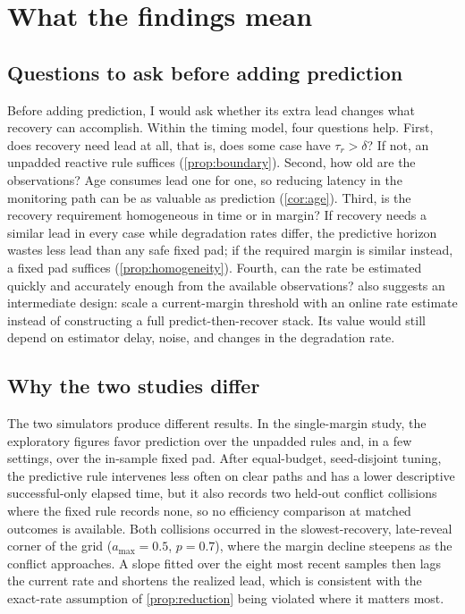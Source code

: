 \section{What the findings mean}
\label{sec:discussion}

\subsection{Questions to ask before adding prediction}

Before adding prediction, I would ask whether its extra lead changes what
recovery can accomplish.  Within the timing model, four questions help.
First, does recovery need lead at all, that is, does some case have
$\tau_r>\delta$?  If not, an unpadded reactive rule suffices
(\cref{prop:boundary}).  Second, how old are the observations?  Age consumes
lead one for one, so reducing latency in the monitoring path can be as valuable
as prediction (\cref{cor:age}).  Third, is the recovery requirement homogeneous
in time or in margin?  If recovery needs a similar lead in every case while
degradation rates differ, the predictive horizon wastes less lead than any safe
fixed pad; if the required margin is similar instead, a fixed pad suffices
(\cref{prop:homogeneity}).  Fourth, can the rate be estimated quickly and
accurately enough from the available observations?   also
suggests an intermediate design: scale a current-margin threshold with an online
rate estimate instead of constructing a full predict-then-recover stack.  Its
value would still depend on estimator delay, noise, and changes in the
degradation rate.

\subsection{Why the two studies differ}

The two simulators produce different results.  In the single-margin study, the
exploratory figures favor prediction over the unpadded rules and, in a few
settings, over the in-sample fixed pad.  After equal-budget, seed-disjoint
tuning, the predictive rule intervenes less often on clear paths and has a lower
descriptive successful-only elapsed time, but it also records two held-out
conflict collisions where the fixed rule records none, so no efficiency
comparison at matched outcomes is available.  Both collisions occurred in the
slowest-recovery, late-reveal corner of the grid ($a_{\max}=0.5$, $p=0.7$),
where the margin decline steepens as the conflict approaches.  A slope fitted
over the eight most recent samples then lags the current rate and shortens the
realized lead, which is consistent with the exact-rate assumption of
\cref{prop:reduction} being violated where it matters most.

